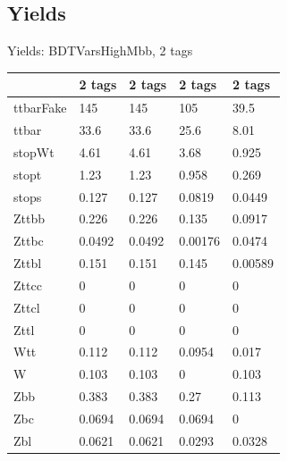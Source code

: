 
\subsection{Yields}

\begin{frame}{Yields: BDTVarsHighMbb, 2 tags}
\begin{center}
  \begin{tabular}{l| >{\centering\let\newline\\\arraybackslash\hspace{0pt}}m{1.4cm}| >{\centering\let\newline\\\arraybackslash\hspace{0pt}}m{1.4cm}| >{\centering\let\newline\\\arraybackslash\hspace{0pt}}m{1.4cm}| >{\centering\let\newline\\\arraybackslash\hspace{0pt}}m{1.4cm}}
    & 2 tags & 2 tags & 2 tags & 2 tags \\
 \hline \hline
    ttbarFake& 145 & 145 & 105 & 39.5 \\
 \hline
    ttbar& 33.6 & 33.6 & 25.6 & 8.01 \\
 \hline
    stopWt& 4.61 & 4.61 & 3.68 & 0.925 \\
 \hline
    stopt& 1.23 & 1.23 & 0.958 & 0.269 \\
 \hline
    stops& 0.127 & 0.127 & 0.0819 & 0.0449 \\
 \hline
    Zttbb& 0.226 & 0.226 & 0.135 & 0.0917 \\
 \hline
    Zttbc& 0.0492 & 0.0492 & 0.00176 & 0.0474 \\
 \hline
    Zttbl& 0.151 & 0.151 & 0.145 & 0.00589 \\
 \hline
    Zttcc& 0 & 0 & 0 & 0 \\
 \hline
    Zttcl& 0 & 0 & 0 & 0 \\
 \hline
    Zttl& 0 & 0 & 0 & 0 \\
 \hline
    Wtt& 0.112 & 0.112 & 0.0954 & 0.017 \\
 \hline
    W& 0.103 & 0.103 & 0 & 0.103 \\
 \hline
    Zbb& 0.383 & 0.383 & 0.27 & 0.113 \\
 \hline
    Zbc& 0.0694 & 0.0694 & 0.0694 & 0 \\
 \hline
    Zbl& 0.0621 & 0.0621 & 0.0293 & 0.0328 \\

\end{tabular}
\end{center}
\end{frame}
